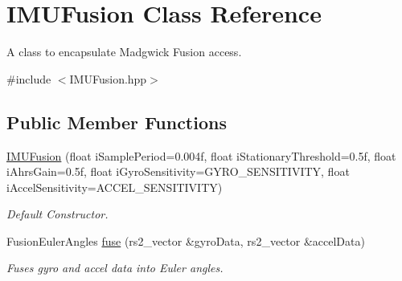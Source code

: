 \hypertarget{classIMUFusion}{}\section{I\+M\+U\+Fusion Class Reference}
\label{classIMUFusion}


A class to encapsulate Madgwick Fusion access.  




{\ttfamily \#include $<$I\+M\+U\+Fusion.\+hpp$>$}

\subsection*{Public Member Functions}
\begin{DoxyCompactItemize}
\item 
\hyperlink{classIMUFusion_ab4624c7f974e2e9328b62a6b945dbeb4}{I\+M\+U\+Fusion} (float i\+Sample\+Period=0.\+004f, float i\+Stationary\+Threshold=0.\+5f, float i\+Ahrs\+Gain=0.\+5f, float i\+Gyro\+Sensitivity=\+G\+Y\+R\+O\+\_\+\+S\+E\+N\+S\+I\+T\+I\+V\+I\+T\+Y, float i\+Accel\+Sensitivity=\+A\+C\+C\+E\+L\+\_\+\+S\+E\+N\+S\+I\+T\+I\+V\+I\+T\+Y)
\begin{DoxyCompactList}\small\item\em Default Constructor. \end{DoxyCompactList}\item 
Fusion\+Euler\+Angles \hyperlink{classIMUFusion_a47060c975f3a11d03dca5de9de1e8098}{fuse} (rs2\+\_\+vector \&gyro\+Data, rs2\+\_\+vector \&accel\+Data)
\begin{DoxyCompactList}\small\item\em Fuses gyro and accel data into Euler angles. \end{DoxyCompactList}\end{DoxyCompactItemize}
